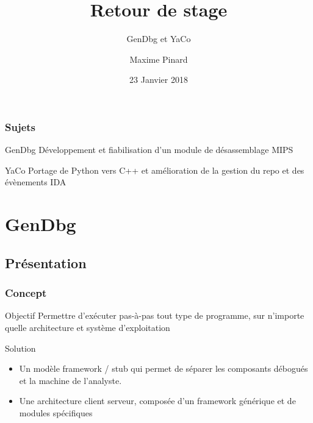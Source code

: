 \documentclass[aspectratio=169,11pt]{beamer}
\title{Retour de stage}
\subtitle{GenDbg et YaCo}
\author{Maxime Pinard}
\institute[UTBM]{Université de Technologie de Belfort Montbéliard}
\date{23 Janvier 2018}
\begin{document}
	\begin{frame}
		\titlepage
	\end{frame}
	\begin{frame}
		\frametitle{Sujets}
		\begin{block}{GenDbg}
			Développement et fiabilisation d'un module de désassemblage MIPS
		\end{block}
		\vspace{1cm}
		\begin{block}{YaCo}
			Portage de Python vers C++ et amélioration de la gestion du repo et des évènements IDA
		\end{block}
	\end{frame}
	\section{GenDbg}
		\subsection{Présentation}
			\begin{frame}
				\frametitle{Concept}
				\begin{block}{Objectif}
					Permettre d'exécuter pas-à-pas tout type de programme, sur n'importe quelle architecture et système d'exploitation
				\end{block}
				\begin{block}{Solution}
					\begin{itemize}
						\item Un modèle framework / stub qui permet de séparer les composants débogués et la machine de l'analyste.
						\item Une architecture client serveur, composée d'un framework générique et de modules spécifiques
					\end{itemize}
				\end{block}
			\end{frame}
\end{document}
